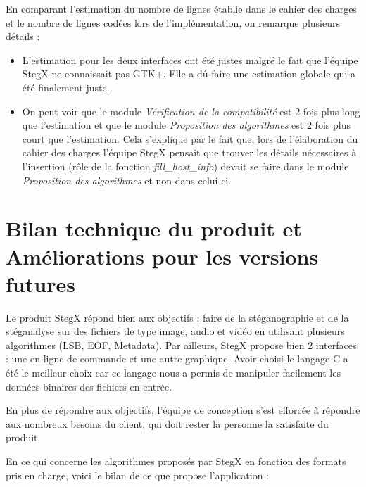 \documentclass[11pt]{article}
\begin{document}
En comparant l'estimation du nombre de lignes établie dans le cahier des 
charges et le nombre de lignes codées lors de l'implémentation, on remarque 
plusieurs détails : 

\begin{itemize}
\item L'estimation pour les deux interfaces ont été justes malgré le fait 
que l'équipe StegX ne connaissait pas GTK+. Elle a dû faire une estimation 
globale qui a été finalement juste. 
\item On peut voir que le module \textit{Vérification de la compatibilité}
est 2 fois plus long que l'estimation et que le module \textit{Proposition 
des algorithmes} est 2 fois plus court que l'estimation. Cela s'explique 
par le fait que, lors de l'élaboration du cahier des charges l'équipe StegX
pensait que trouver les détails nécessaires à l'insertion (rôle de la fonction 
\textit{fill\_host\_info}) devait se faire dans le module \textit{Proposition 
des algorithmes} et non dans celui-ci.  
\end{itemize}

\section{Bilan technique du produit et Améliorations pour les versions futures}

Le produit StegX répond bien aux objectifs : faire de la stéganographie 
et de la stéganalyse sur des fichiers de type image, audio et vidéo en 
utilisant plusieurs algorithmes (LSB, EOF, Metadata). 
Par ailleurs, StegX propose bien 2 interfaces : une en ligne de commande 
et une autre graphique. 
Avoir choisi le langage C a été le meilleur choix car ce langage nous a 
permis de manipuler facilement les données binaires des fichiers en entrée. 

En plus de répondre aux objectifs, l'équipe de conception s'est efforcée 
à répondre aux nombreux besoins du client, qui doit rester la personne la 
satisfaite du produit. 

En ce qui concerne les algorithmes proposés par StegX en fonction des 
formats pris en charge, voici le bilan de ce que propose l'application : 
\newline
\end{document}
